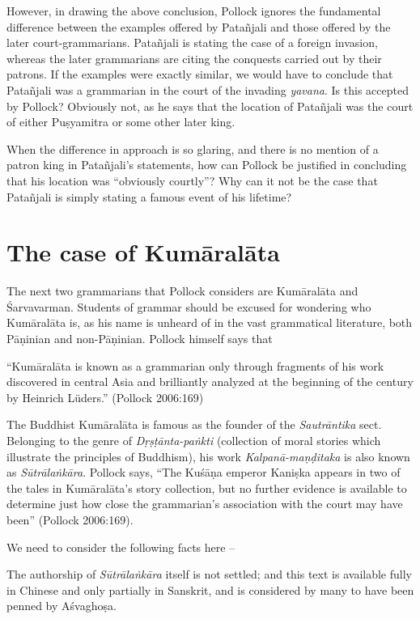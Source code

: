 However, in drawing the above conclusion, Pollock ignores the fundamental difference between the examples offered by Patañjali and those offered by the later court-grammarians. Patañjali is stating the case of a foreign invasion, whereas the later grammarians are citing the conquests carried out by their patrons. If the examples were exactly similar, we would have to conclude that Patañjali was a grammarian in the court of the invading {\sl yavana}. Is this accepted by Pollock? Obviously not, as he says that the location of Patañjali was the court of either Puṣyamitra or some other later king.

When the difference in approach is so glaring, and there is no mention of a patron king in Patañjali's statements, how can Pollock be justified in concluding that his location was ``obviously courtly''? Why can it not be the case that Patañjali is simply stating a famous event of his lifetime?

\section{The case of Kumāralāta}\label{chap3-sec10}

The next two grammarians that Pollock considers are Kumāralāta and Śarvavarman. Students of grammar should be excused for wondering who Kumāralāta is, as his name is unheard of in the vast grammatical literature, both Pāṇinian and non-Pāṇinian. Pollock himself says that 
\begin{myquote}
``Kumāralāta is known as a grammarian only through fragments of his work discovered in central Asia and brilliantly analyzed at the beginning of the century by Heinrich Lüders.''
\hfill (Pollock 2006:169)
\end{myquote}

The Buddhist Kumāralāta is famous as the founder of the {\sl Sautrāntika} sect. Belonging to the genre of {\sl Dṛṣṭānta-paṅkti} (collection of moral stories which illustrate the principles of Buddhism), his work {\sl Kalpanā-maṇḍitaka} is also known as {\sl Sūtrālaṅkāra}. Pollock says, ``The Kuśāṇa emperor Kaniṣka appears in two of the tales in Kumāralāta's story collection, but no further evidence is available to determine just how close the grammarian's association with the court may have been'' (Pollock 2006:169).

We need to consider the following facts here --

The authorship of {\sl Sūtrālaṅkāra} itself is not settled; and this text is available fully in Chinese and only partially in Sanskrit, and is considered by many to have been penned by Aśvaghoṣa.

